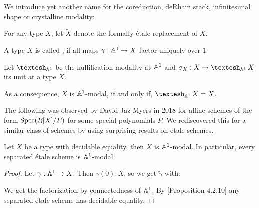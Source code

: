 
We introduce yet another name for the coreduction, deRham stack, infinitesimal shape or crystalline modality:

\begin{definition}
  For any type $X$, let $\widetilde{X}$ denote the formally étale replacement of $X$.
\end{definition}

\begin{definition}
  A type $X$ is called , if all maps $\gamma:\mathbb{A}^1\to X$ factor uniquely over $1$:
  \begin{center}
  \end{center}
\end{definition}

\begin{definition}
  Let $\shape_{\A^1}$ be the nullification modality at $\mathbb{A}^1$ and $\sigma_X:X\to \shape_{\A^1}X$ its unit at a type $X$. 
\end{definition}

As a consequence, $X$ is $\mathbb{A}^1$-modal, if and only if, $\shape_{\A^1}X=X$.

The following was observed by David Jaz Myers in 2018 for affine schemes of the form $\operatorname{Spec} (R[X]/P)$ for some special polynomials $P$.
We rediscovered this for a similar class of schemes by using surprising results on étale schemes.

\begin{proposition}
  Let $X$ be a type with decidable equality, then $X$ is $\mathbb{A}^1$-modal.
  In particular, every separated étale scheme is $\mathbb{A}^1$-modal.
\end{proposition}

\begin{proof}
  Let $\gamma:\mathbb{A}^1\to X$.
  Then $\gamma(0):X$, so we get $\tilde{\gamma}$ with:
  \begin{center}
  \end{center}
  We get the factorization by connectedness of $\mathbb{A}^1$.
  By \cite{etale-draft}[Proposition 4.2.10] any separated étale scheme has decidable equality.
\end{proof}

